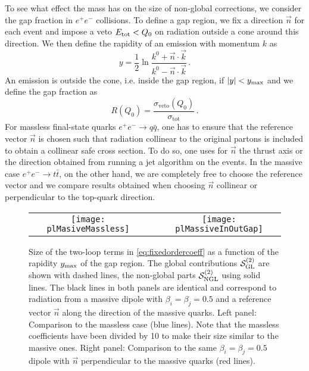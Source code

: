 \documentclass[11pt,a4paper]{article}
\begin{document}
To see what effect the mass has on the size of non-global corrections, we consider the gap fraction in $e^+e^-$ collisions. To define a gap region, we fix a direction $\vec{n}$ for each event and impose a veto $E_{\rm tot}< Q_0$ on radiation outside a cone around this direction. We then define the rapidity of an emission with momentum $k$ as
\begin{equation}
y  = \frac{1}{2}  \ln \frac{k^0+ \vec{n}\cdot \vec{k}}{k^0- \vec{n}\cdot \vec{k}}\,.
\end{equation}
An emission is outside the cone, i.e. inside the gap region, if $|y|<y_{\rm max}$ and we define the gap fraction as
\begin{equation}\label{eq:gapfraction}
R\left(Q_0\right)=\frac{\sigma_{\text{veto}}(Q_0)}{\sigma_{\text{tot}}}\, .
\end{equation}
For massless final-state quarks $e^+e^- \to q \bar{q}$, one has to ensure that the reference vector $\vec{n}$ is chosen such that radiation collinear to the original partons is included to obtain a collinear safe cross section. To do so, one uses for $\vec{n}$ the thrust axis or the direction obtained from running a jet algorithm on the events. In the massive case $e^+e^- \to t \bar{t}$, on the other hand, we are completely free to choose the reference vector and we compare results obtained when choosing $\vec{n}$ collinear or perpendicular to the top-quark direction. 

\begin{figure}[t]
	\centering
	\begin{tabular}{ccc}
	\texttt{[image: plMasiveMassless]}	&& \texttt{[image: plMassiveInOutGap]}
	\end{tabular}
	\caption{Size of the two-loop terms in \eqref{eq:fixedordercoeff} as a function of the rapidity $y_{\rm max}$ of the gap region. The global contributions $\mathcal{S}_{\rm GL} ^{(2)}$ are shown with dashed lines, the non-global parts $\mathcal{S}_{\rm NGL} ^{(2)}$ using solid lines. The black lines in both panels are identical and correspond to radiation from a massive dipole with  $\beta_i = \beta_j=0.5$ and a reference vector $\vec{n}$ along the direction of the massive quarks. Left panel: Comparison to the massless case (blue lines). Note that the massless coefficients have been divided by 10 to make their size similar to the massive ones.  Right panel: Comparison to the same $\beta_i = \beta_j =0.5$ dipole with $\vec{n}$ perpendicular to the massive quarks (red lines). \label{fig:comparison}}
\end{figure}
\end{document}
